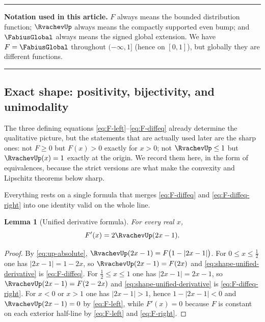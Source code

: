 \documentclass[11pt,oneside]{article}
\newtheorem{lemma}[theorem]{Lemma}
\theoremstyle{definition}
\theoremstyle{remark}
\newenvironment{boxedremark}{%
  \par\smallskip\noindent\begin{center}\begin{minipage}{0.94\textwidth}%
  \color{black}\hrule\vspace{0.6em}\small
}{%
  \vspace{0.6em}\hrule\end{minipage}\end{center}\smallskip
}
\begin{document}
\begin{boxedremark}
\textbf{Notation used in this article.}
$F$ always means the bounded distribution function; $\RvachevUp$ always means the compactly
supported even bump; and $\FabiusGlobal$ always means the signed global extension.  We have
$F=\FabiusGlobal$ throughout $(-\infty,1]$ (hence on $[0,1]$), but globally they are different
functions.
\end{boxedremark}

\subsection{Exact shape: positivity, bijectivity, and unimodality}
\label{shape:basic}

The three defining equations \eqref{eq:F-left}--\eqref{eq:F-diffeq} already determine the
qualitative picture, but the statements that are actually used later are the sharp ones: not
$F\ge0$ but $F(x)>0$ exactly for $x>0$; not $\RvachevUp\le1$ but $\RvachevUp(x)=1$ exactly at the origin.
We record them here, in the form of equivalences, because the strict versions are what make
the convexity and Lipschitz theorems below sharp.

Everything rests on a single formula that merges \eqref{eq:F-diffeq} and
\eqref{eq:F-diffeq-right} into one identity valid on the whole line.

\begin{lemma}[Unified derivative formula]
\label{thm:shape-unified-derivative}
For every real $x$,
\begin{equation}
 F'(x)=2\RvachevUp(2x-1).                                        \label{eq:shape-unified-derivative}
\end{equation}
\end{lemma}

\begin{proof}
By \eqref{eq:up-absolute}, $\RvachevUp(2x-1)=F\bigl(1-|2x-1|\bigr)$.  For $0\le x\le\tfrac12$ one has
$|2x-1|=1-2x$, so $\RvachevUp(2x-1)=F(2x)$ and \eqref{eq:shape-unified-derivative} is
\eqref{eq:F-diffeq}.  For $\tfrac12\le x\le1$ one has $|2x-1|=2x-1$, so $\RvachevUp(2x-1)=F(2-2x)$
and \eqref{eq:shape-unified-derivative} is \eqref{eq:F-diffeq-right}.  For $x<0$ or $x>1$ one
has $|2x-1|>1$, hence $1-|2x-1|<0$ and $\RvachevUp(2x-1)=0$ by \eqref{eq:F-left}, while $F'(x)=0$
because $F$ is constant on each exterior half-line by \eqref{eq:F-left} and
\eqref{eq:F-right}.
\end{proof}
\end{document}
